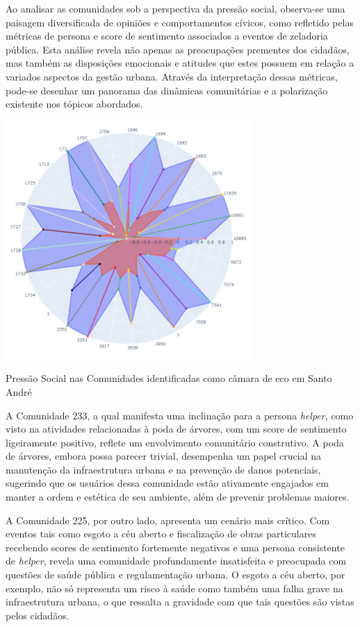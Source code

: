 Ao analisar as comunidades sob a perspectiva da pressão social, observa-se uma paisagem diversificada de opiniões e comportamentos cívicos, como refletido pelas métricas de persona e score de sentimento associados a eventos de zeladoria pública. Esta análise revela não apenas as preocupações prementes dos cidadãos, mas também as disposições emocionais e atitudes que estes possuem em relação a variados aspectos da gestão urbana. Através da interpretação dessas métricas, pode-se desenhar um panorama das dinâmicas comunitárias e a polarização existente nos tópicos abordados.

\begin{quadro}[htb]
	\centering
	\includegraphics[width=0.7\textwidth]{images/echo_chambers_santo_andre_social_pressure.png}
	\caption{Pressão Social nas Comunidades identificadas como câmara de eco em Santo André}
	\label{fig:echo_chambers_santo_andre_social_pressure}
\end{quadro}

A Comunidade 233, a qual manifesta uma inclinação para a persona \textit{helper}, como visto na atividades relacionadas à poda de árvores, com um score de sentimento ligeiramente positivo, reflete um envolvimento comunitário construtivo. A poda de árvores, embora possa parecer trivial, desempenha um papel crucial na manutenção da infraestrutura urbana e na prevenção de danos potenciais, sugerindo que os usuários dessa comunidade estão ativamente engajados em manter a ordem e estética de seu ambiente, além de prevenir problemas maiores.

A Comunidade 225, por outro lado, apresenta um cenário mais crítico. Com eventos tais como esgoto a céu aberto e fiscalização de obras particulares recebendo scores de sentimento fortemente negativos e uma persona consistente de \textit{helper}, revela uma comunidade profundamente insatisfeita e preocupada com questões de saúde pública e regulamentação urbana. O esgoto a céu aberto, por exemplo, não só representa um risco à saúde como também uma falha grave na infraestrutura urbana, o que ressalta a gravidade com que tais questões são vistas pelos cidadãos.

